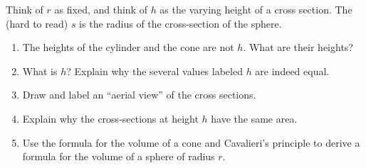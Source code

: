 \documentclass[nooutcomes]{ximera}
\begin{document}
\begin{problem}
\begin{image}
{}
\end{image}
Think of $r$ as fixed, and think of $h$ as the varying height of a cross section.  The (hard to read) $s$ is the radius of the cross-section of the sphere.  
\begin{enumerate}
\item The heights of the cylinder and the cone are not $h$.  What are their heights?  
\item What is $h$?  Explain why the several values labeled $h$ are indeed equal.   
\item Draw and label an ``aerial view'' of the cross sections.   
\item Explain why the cross-sections at height $h$ have the same area.  
\item Use the formula for the volume of a cone and Cavalieri's principle to derive a formula for the volume of a sphere of radius $r$.  
\end{enumerate}
\end{problem}
\end{document}
